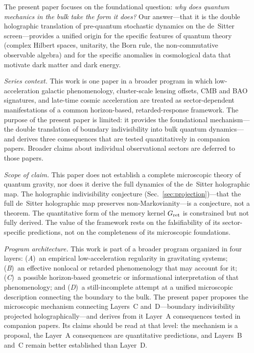 \documentclass[aps,prd,twocolumn,superscriptaddress,nofootinbib]{revtex4-2}
\begin{document}
The present paper focuses on the foundational question: \emph{why does quantum mechanics in the bulk take the form it does?} Our answer---that it is the double holographic translation of pre-quantum stochastic dynamics on the de~Sitter screen---provides a unified origin for the specific features of quantum theory (complex Hilbert spaces, unitarity, the Born rule, the non-commutative observable algebra) and for the specific anomalies in cosmological data that motivate dark matter and dark energy.

\emph{Series context.} This work is one paper in a broader program in which low-acceleration galactic phenomenology, cluster-scale lensing offsets, CMB and BAO signatures, and late-time cosmic acceleration are treated as sector-dependent manifestations of a common horizon-based, retarded-response framework. The purpose of the present paper is limited: it provides the foundational mechanism---the double translation of boundary indivisibility into bulk quantum dynamics---and derives three consequences that are tested quantitatively in companion papers. Broader claims about individual observational sectors are deferred to those papers.

\emph{Scope of claim.} This paper does not establish a complete microscopic theory of quantum gravity, nor does it derive the full dynamics of the de~Sitter holographic map. The holographic indivisibility conjecture (Sec.~\ref{sec:projection})---that the full de~Sitter holographic map preserves non-Markovianity---is a conjecture, not a theorem. The quantitative form of the memory kernel $G_{\rm ret}$ is constrained but not fully derived. The value of the framework rests on the falsifiability of its sector-specific predictions, not on the completeness of its microscopic foundations.

\emph{Program architecture.} This work is part of a broader program organized in four layers: (\emph{A})~an empirical low-acceleration regularity in gravitating systems; (\emph{B})~an effective nonlocal or retarded phenomenology that may account for it; (\emph{C})~a possible horizon-based geometric or informational interpretation of that phenomenology; and (\emph{D})~a still-incomplete attempt at a unified microscopic description connecting the boundary to the bulk. The present paper proposes the microscopic mechanism connecting Layers~C and~D---boundary indivisibility projected holographically---and derives from it Layer~A consequences tested in companion papers. Its claims should be read at that level: the mechanism is a proposal, the Layer~A consequences are quantitative predictions, and Layers~B and~C remain better established than Layer~D.
\end{document}
